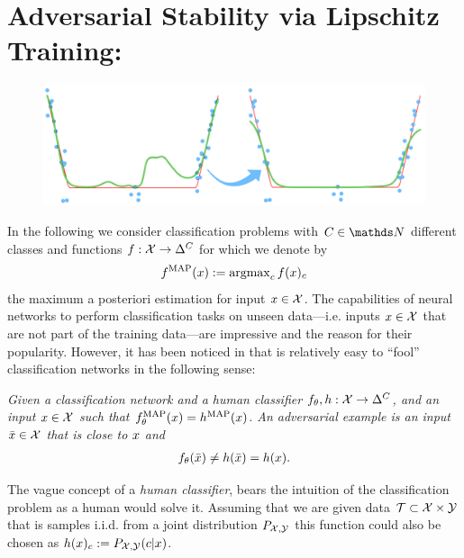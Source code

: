 \section{Adversarial Stability via Lipschitz Training: \cite{bungert2021clip}}\label{sec:CLIP}
%
\begin{figure}
	\centering
	\includegraphics[width=.5\textwidth]{atelier/CLIP/CLIP.png}
\end{figure}
%
%
In the following we consider classification problems with $C\in\N$ different classes and functions $f:\mathcal{X}\to\Delta^C$ for which we denote by 
\begin{align*}
f^{\operatorname{MAP}}(x):=\operatorname{argmax}_c f(x)_c
\end{align*}%
%
the maximum a posteriori estimation for input $x\in\mathcal{X}$. The capabilities of neural networks to perform classification tasks on unseen data---i.e. inputs $x\in\mathcal{X}$ that are not part of the training data---are impressive and the reason for their popularity. However, it has been noticed in \cite{goodfellow2014explaining} that is relatively easy to \enquote{fool} classification networks in the following sense:
%
\begin{center}
\textit{
Given a classification network and a human classifier $f_\theta, h:\mathcal{X}\to\Delta^C$, and an input $x\in\mathcal{X}$ such that $f_\theta^{\operatorname{MAP}}(x) = h^{\operatorname{MAP}}(x)$. An adversarial example is an input $\bar{x}\in \mathcal{X}$ that is close to $x$ and
%
\begin{align*}
f_\theta(\bar{x})\neq h(\bar{x}) = h(x).
\end{align*}
}
\end{center}
%
%
The vague concept of a \emph{human classifier}, bears the intuition of the classification problem as a human would solve it. Assuming that we are given data $\mathcal{T}\subset \mathcal{X}\times\mathcal{\mathcal{Y}}$ that is samples i.i.d. from a joint distribution $P_{\mathcal{X},\mathcal{\mathcal{Y}}}$ this function could also be chosen as $h(x)_c:=P_{\mathcal{X},\mathcal{\mathcal{Y}}}(c|x)$.


